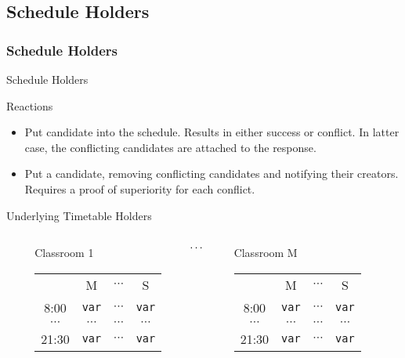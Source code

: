 \subsection{Schedule Holders}
\subsubsection{Schedule Holders}

\def\ttable{\tiny%
  \def\var{\texttt{var}}
  \begin{tabular}{|c||c|c|c|}
    \hline  & M        & $\cdots$ & S       \\\hhline{|=##=|=|=|}
    8:00    & \var     & $\cdots$ & \var    \\\hline
    $\cdots$& $\cdots$ & $\cdots$ & $\cdots$\\\hline
    21:30   & \var     & $\cdots$ & \var    \\\hline
  \end{tabular}}

\begin{frame}{Schedule Holders}
  \begin{block}{Reactions}
    \begin{itemize}
      \item Put candidate into the schedule. Results in either success or conflict.
            In latter case, the conflicting candidates are attached to the response.
      \item Put a candidate, removing conflicting candidates and notifying their
            creators. Requires a proof of \alert{superiority} for each conflict.
    \end{itemize}
  \end{block}
  \begin{block}{Underlying Timetable Holders}
    \centering
    \bigskip
    \begin{columns}
      \begin{column}{.1\textwidth}\end{column}
      \begin{column}{.3\textwidth}
        \centering Classroom 1 \\\medskip \ttable
      \end{column}
      \begin{column}{.04\textwidth}
        $\Huge \cdots$
      \end{column}
      \begin{column}{.3\textwidth}
        \centering Classroom M \\\medskip \ttable
      \end{column}
      \begin{column}{.1\textwidth}\end{column}
    \end{columns}
  \end{block}
\end{frame}

